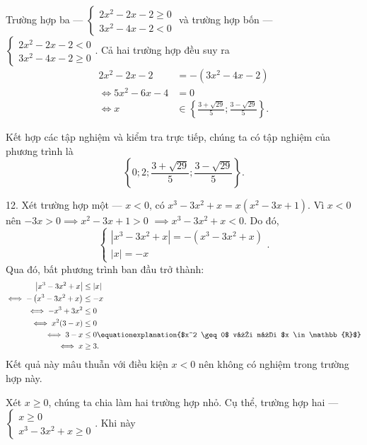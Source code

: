 \textcolor{colorEmphasis}{Trường hợp ba --- $
\begin{cases}
   2x^2 - 2x - 2 \geq 0 \\
   3x^2 - 4x - 2 < 0
\end{cases}$} và \textcolor{colorEmphasis}{trường hợp bốn --- $
\begin{cases}
   2x^2 - 2x - 2 < 0 \\
   3x^2 - 4x - 2 \geq 0
\end{cases}$}. Cả hai trường hợp đều suy ra
\begin{align*}
   2x^2 - 2x - 2 &= -\left(3x^2 - 4x - 2\right) \\
   \iff 5x^2 - 6x - 4 &= 0 \\
   \iff x &\in \left\{\frac{3 + \sqrt{29}}{5}; \frac{3 - \sqrt{29}}{5}\right\}.
\end{align*}

Kết hợp các tập nghiệm và kiểm tra trực tiếp, chúng ta có tập nghiệm của phương trình là $$\left\{0; 2; \frac{3 + \sqrt{29}}{5}; \frac{3 - \sqrt{29}}{5}\right\}.$$

12. Xét \textcolor{colorEmphasisCyan}{trường hợp một --- $x < 0$}, có $x^3 - 3x^2 + x = x\left(x^2 - 3x + 1\right)$. Vì $x < 0$ nên $-3x > 0 \implies x^2 - 3x + 1 > 0$ $\implies x^3 - 3x^2 + x < 0$. Do đó,
$$
\begin{cases}
   |x^3 - 3x^2 + x| = -\left(x^3 - 3x^2 + x\right) \\
   |x| = -x
\end{cases}.
$$
Qua đó, bất phương trình ban đầu trở thành:
\begin{align*}
   \left|x^3 - 3x^2 + x\right| &\leq \left|x\right| \\
   \iff -\left(x^3 - 3x^2 + x\right) &\leq -x \\
   \iff -x^3 + 3x^2 &\leq 0 \\
   \iff x^2 (3 - x) &\leq 0 \\
   \iff 3 - x &\leq 0 \equationexplanation{$x^2 \geq 0$ với mọi $x \in \mathbb{R}$} \\
   \iff x &\geq 3.
\end{align*}
Kết quả này mâu thuẫn với điều kiện $x < 0$ nên không có nghiệm trong trường hợp này.

Xét $x \geq 0$, chúng ta chia làm hai trường hợp nhỏ. Cụ thể, \textcolor{colorEmphasis}{trường hợp hai --- $\begin{cases}
   x \geq 0 \\
   x^3 - 3x^2 + x \geq 0
\end{cases}$}. Khi này

